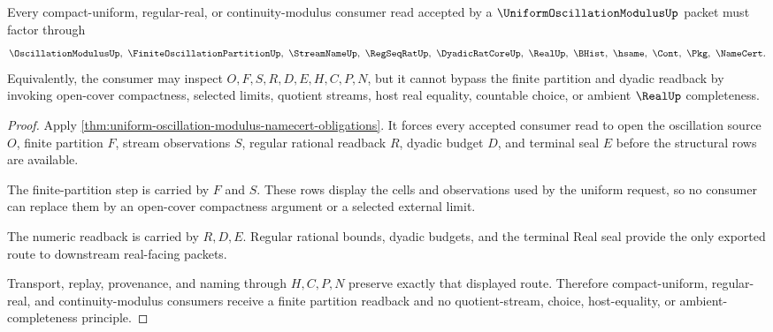 \begin{theorem}
\label{thm:uniform-oscillation-modulus-finite-partition-readback}
Every compact-uniform, regular-real, or continuity-modulus consumer read accepted by a $\UniformOscillationModulusUp$ packet must factor through
$$
\OscillationModulusUp,\ \FiniteOscillationPartitionUp,\ \StreamNameUp,\ \RegSeqRatUp,\ \DyadicRatCoreUp,\ \RealUp,\ \BHist,\ \hsame,\ \Cont,\ \Pkg,\ \NameCert .
$$
Equivalently, the consumer may inspect $O,F,S,R,D,E,H,C,P,N$, but it cannot bypass the finite partition and dyadic readback by invoking open-cover compactness, selected limits, quotient streams, host real equality, countable choice, or ambient $\RealUp$ completeness.
\end{theorem}
\begin{proof}
Apply \autoref{thm:uniform-oscillation-modulus-namecert-obligations}. It forces every accepted consumer read to open the oscillation source $O$, finite partition $F$, stream observations $S$, regular rational readback $R$, dyadic budget $D$, and terminal seal $E$ before the structural rows are available.

The finite-partition step is carried by $F$ and $S$. These rows display the cells and observations used by the uniform request, so no consumer can replace them by an open-cover compactness argument or a selected external limit.

The numeric readback is carried by $R,D,E$. Regular rational bounds, dyadic budgets, and the terminal Real seal provide the only exported route to downstream real-facing packets.

Transport, replay, provenance, and naming through $H,C,P,N$ preserve exactly that displayed route. Therefore compact-uniform, regular-real, and continuity-modulus consumers receive a finite partition readback and no quotient-stream, choice, host-equality, or ambient-completeness principle.
\end{proof}



